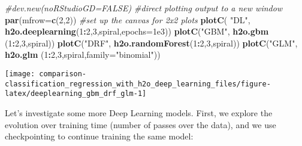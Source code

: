 \documentclass[]{book}
\newenvironment{Shaded}{\begin{snugshade}}{\end{snugshade}}
\newcommand{\CommentTok}[1]{\textcolor[rgb]{0.56,0.35,0.01}{\textit{#1}}}
\newcommand{\DataTypeTok}[1]{\textcolor[rgb]{0.13,0.29,0.53}{#1}}
\newcommand{\DecValTok}[1]{\textcolor[rgb]{0.00,0.00,0.81}{#1}}
\newcommand{\FloatTok}[1]{\textcolor[rgb]{0.00,0.00,0.81}{#1}}
\newcommand{\KeywordTok}[1]{\textcolor[rgb]{0.13,0.29,0.53}{\textbf{#1}}}
\newcommand{\NormalTok}[1]{#1}
\newcommand{\OperatorTok}[1]{\textcolor[rgb]{0.81,0.36,0.00}{\textbf{#1}}}
\newcommand{\StringTok}[1]{\textcolor[rgb]{0.31,0.60,0.02}{#1}}
\begin{document}
\begin{Shaded}
\begin{Highlighting}[]
\CommentTok{#dev.new(noRStudioGD=FALSE) #direct plotting output to a new window}
\KeywordTok{par}\NormalTok{(}\DataTypeTok{mfrow=}\KeywordTok{c}\NormalTok{(}\DecValTok{2}\NormalTok{,}\DecValTok{2}\NormalTok{)) }\CommentTok{#set up the canvas for 2x2 plots}
\KeywordTok{plotC}\NormalTok{( }\StringTok{"DL"}\NormalTok{, }\KeywordTok{h2o.deeplearning}\NormalTok{(}\DecValTok{1}\OperatorTok{:}\DecValTok{2}\NormalTok{,}\DecValTok{3}\NormalTok{,spiral,}\DataTypeTok{epochs=}\FloatTok{1e3}\NormalTok{))}
\KeywordTok{plotC}\NormalTok{(}\StringTok{"GBM"}\NormalTok{, }\KeywordTok{h2o.gbm}\NormalTok{         (}\DecValTok{1}\OperatorTok{:}\DecValTok{2}\NormalTok{,}\DecValTok{3}\NormalTok{,spiral))}
\KeywordTok{plotC}\NormalTok{(}\StringTok{"DRF"}\NormalTok{, }\KeywordTok{h2o.randomForest}\NormalTok{(}\DecValTok{1}\OperatorTok{:}\DecValTok{2}\NormalTok{,}\DecValTok{3}\NormalTok{,spiral))}
\KeywordTok{plotC}\NormalTok{(}\StringTok{"GLM"}\NormalTok{, }\KeywordTok{h2o.glm}\NormalTok{         (}\DecValTok{1}\OperatorTok{:}\DecValTok{2}\NormalTok{,}\DecValTok{3}\NormalTok{,spiral,}\DataTypeTok{family=}\StringTok{"binomial"}\NormalTok{))}
\end{Highlighting}
\end{Shaded}

\begin{center}\texttt{[image: comparison-classification\_regression\_with\_h2o\_deep\_learning\_files/figure-latex/deeplearning\_gbm\_drf\_glm-1]} \end{center}

Let's investigate some more Deep Learning models. First, we explore the evolution over training time (number of passes over the data), and we use checkpointing to continue training the same model:
\end{document}
